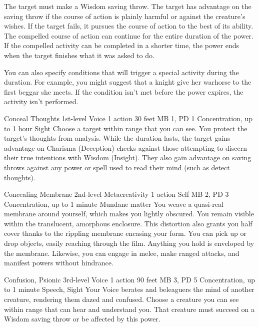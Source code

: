 The target must make a Wisdom saving throw. The target has
advantage on the saving throw if the course of action is plainly
harmful or against the creature's wishes. If the target fails,
it pursues the course of action to the best of its ability.
The compelled course of action can continue for the entire
duration of the power. If the compelled activity can be completed
in a shorter time, the power ends when the target finishes
what it was asked to do.

You can also specify conditions that will trigger a special
activity during the duration. For example, you might suggest
that a knight give her warhorse to the first beggar she meets.
If the condition isn't met before the power expires, the
activity isn't performed.

\DndPowerHeader%
    {Conceal Thoughts\label{pwr:conceal_thoughts}}
    {1st-level Voice}
    {1 action}
    {30 feet}
    {MB 1, PD 1}
    {Concentration, up to 1 hour}
    {Sight}
Choose a target within range that you can
see. You protect the target's thoughts from analysis. While
the duration lasts, the target gains advantage on 
Charisma (Deception) checks against those
attempting to discern their true intentions
with Wisdom (Insight). They also gain advantage on saving
throws against any power or spell used to read their mind
(such as detect thoughts).

\DndPowerHeader%
    {Concealing Membrane\label{pwr:concealing_membrane}}
    {2nd-level Metacreativity}
    {1 action}
    {Self}
    {MB 2, PD 3}
    {Concentration, up to 1 minute}
    {Mundane matter}
You weave a quasi-real membrane around yourself,
which makes you lightly obscured. You remain visible within
the translucent, amorphous enclosure. This distortion also
grants you half cover thanks to the rippling membrane encasing
your form. You can pick up or drop objects, easily reaching
through the film. Anything you hold is enveloped by the membrane.
Likewise, you can engage in melee, make ranged attacks, and
manifest powers without hindrance.

\DndPowerHeader%
    {Confusion, Psionic\label{pwr:confusion_psionic}}
    {3rd-level Voice}
    {1 action}
    {90 feet}
    {MB 3, PD 5}
    {Concentration, up to 1 minute}
    {Speech, Sight}
Your Voice berates and beleaguers the mind of another creature,
rendering them dazed and confused.
Choose a creature you can see within range that can
hear and understand you.
That creature must succeed on a Wisdom saving throw or
be affected by this power.

